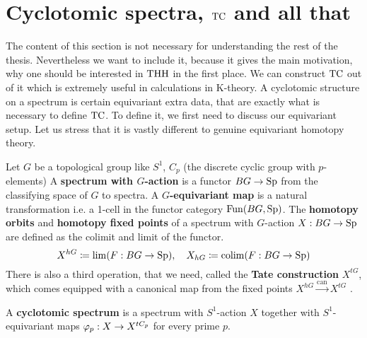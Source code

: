\section{Cyclotomic spectra, $\operatorname{TC}$ and all that}
The content of this section is not necessary for understanding the rest of the thesis. Nevertheless we want to include it, because it gives the main motivation, why one should be interested in $\operatorname{THH}$ in the first place. We can construct $\operatorname{TC}$ out of it which is extremely useful in calculations in K-theory.
A cyclotomic structure on a spectrum is certain equivariant extra data, that are exactly what is necessary to define $\operatorname{TC}$.
 To define it, we first need to discuss our equivariant setup. Let us stress that it is vastly different to genuine equivariant homotopy theory.
\begin{defn}
    Let $G$ be a topological group like $S^1$, $C_p$ (the discrete cyclic group with $p$-elements) 
    A \textbf{spectrum with $G$-action} is a functor $BG\to \operatorname{Sp}$ from the classifying space of $G$ to spectra. A \textbf{$G$-equivariant map} is a natural transformation i.e. a 1-cell in the functor category $\operatorname{Fun}(BG,\operatorname{Sp})$. The \textbf{homotopy orbits} and \textbf{homotopy fixed points} of a spectrum with $G$-action $X:BG\to \operatorname{Sp}$ are defined as the colimit and limit of the functor.
    \begin{equation*}
        X^{hG}\coloneqq \lim(F:BG\to \operatorname{Sp}),\quad X_{hG}\coloneqq \operatorname{colim}(F:BG\to \operatorname{Sp})
    \end{equation*}
    There is also a third operation, that we need, called the \textbf{Tate construction} $X^{tG}$, which comes equipped with a canonical map from the fixed points $X^{hG}\xrightarrow{\mathrm{can}}X^{tG}$ . 
\end{defn}

\begin{defn}\cite[Chapter~2.1]{NS}
A \textbf{cyclotomic spectrum} is a spectrum with $S^1$-action $X$ together with  $S^1$-equivariant maps $\varphi_p: X \rightarrow X^{tC_p}$ for every prime $p$.
\end{defn}

